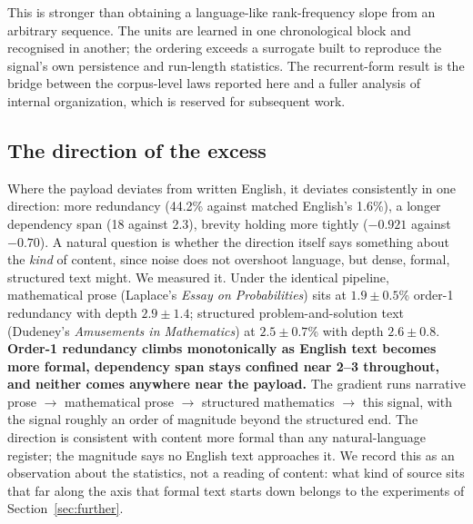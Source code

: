\documentclass[11pt,a4paper]{article}
\begin{document}
This is stronger than obtaining a language-like rank-frequency slope from an arbitrary
sequence. The units are learned in one chronological block and recognised in another;
the ordering exceeds a surrogate built to reproduce the signal's own persistence and
run-length statistics. The recurrent-form result is the bridge between the corpus-level
laws reported here and a fuller analysis of internal organization, which is reserved
for subsequent work.

\subsection{The direction of the excess}
\label{sec:excess}

Where the payload deviates from written English, it deviates consistently in one
direction: more redundancy (44.2\% against matched English's 1.6\%), a longer
dependency span (18 against 2.3), brevity holding more tightly ($-0.921$ against
$-0.70$). A natural question is whether the direction itself says something about the
\emph{kind} of content, since noise does not overshoot language, but dense, formal,
structured text might. We measured it. Under the identical pipeline, mathematical
prose (Laplace's \emph{Essay on Probabilities}) sits at $1.9 \pm 0.5$\% order-1
redundancy with depth $2.9 \pm 1.4$; structured problem-and-solution text (Dudeney's
\emph{Amusements in Mathematics}) at $2.5 \pm 0.7$\% with depth $2.6 \pm 0.8$.
\textbf{Order-1 redundancy climbs monotonically as English text becomes more formal,
dependency span stays confined near 2--3 throughout, and neither comes anywhere near
the payload.} The gradient runs narrative prose $\rightarrow$
mathematical prose $\rightarrow$ structured mathematics $\rightarrow$ this signal,
with the signal roughly an order of magnitude beyond the structured end. The direction
is consistent with content more formal than any natural-language register; the
magnitude says no English text approaches it. We record this as an observation about
the statistics, not a reading of content: what kind of source sits that far along the
axis that formal text starts down belongs to the experiments of
Section~\ref{sec:further}.
\end{document}
